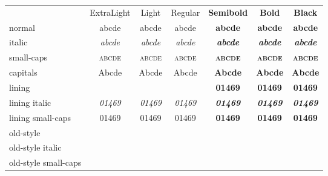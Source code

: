 \documentclass[11pt]{standalone}
\newcommand*\spA{abcde}
\newcommand*\spB{01469}
\newcommand*\spr[1][\spA]{& #1 & #1 & #1 & #1 & #1 & #1 \\}
\begin{document}
\begin{tabular}{
		>{\sourcesanspro}l
		>{\sourcesansproextreme}c
		>{\sourcesansprolight}c
		>{\sourcesanspro}c
		>{\sourcesansprolight\bfseries}c
		>{\sourcesanspro\bfseries}c
		>{\sourcesansproextreme\bfseries}c }
	& ExtraLight & Light & Regular & Semibold & Bold & Black \\
	normal               \spr
	italic               \spr[\itshape\spA]
	small-caps           \spr[\scshape\spA]
	capitals             \spr[\MakeUppercase\spA]
	lining               \spr[\spB]
	lining italic        \spr[\itshape\spB]
	lining small-caps    \spr[\scshape\spB]
	old-style            \spr[\oldstylenums{\spB}]
	old-style italic     \spr[\oldstylenums{\itshape \spB}]
	old-style small-caps \spr[\oldstylenums{\scshape\spB}]
\end{tabular}
\end{document}
